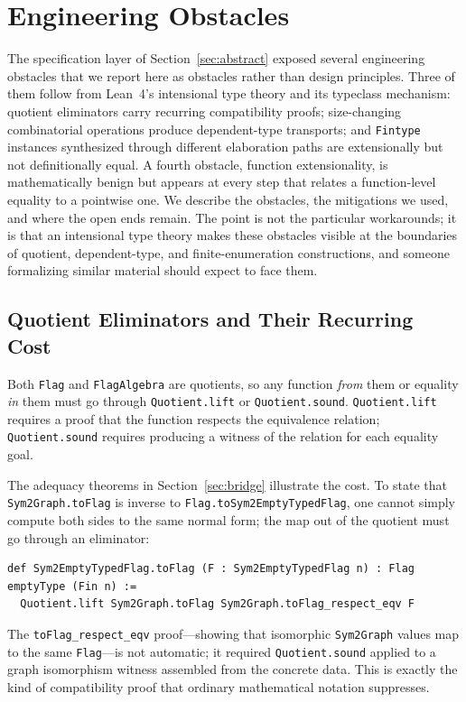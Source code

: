 \documentclass{article}
\newcommand{\lean}[1]{\texttt{#1}}
\begin{document}
\section{Engineering Obstacles}
\label{sec:obstacles}

The specification layer of Section~\ref{sec:abstract} exposed several
engineering obstacles that we report here as obstacles rather than design
principles.  Three of them follow from Lean~4's intensional type theory and
its typeclass mechanism: quotient eliminators carry recurring compatibility
proofs; size-changing combinatorial operations produce dependent-type
transports; and \lean{Fintype} instances synthesized through different
elaboration paths are extensionally but not definitionally equal.  A fourth
obstacle, function extensionality, is mathematically benign but appears at
every step that relates a function-level equality to a pointwise one.  We
describe the obstacles, the mitigations we used, and where the open ends
remain.  The point is not the particular workarounds; it is that an
intensional type theory makes these obstacles visible at the boundaries of
quotient, dependent-type, and finite-enumeration constructions, and someone
formalizing similar material should expect to face them.

\subsection{Quotient Eliminators and Their Recurring Cost}

Both \lean{Flag} and \lean{FlagAlgebra} are quotients, so any function
\emph{from} them or equality \emph{in} them must go through
\lean{Quotient.lift} or \lean{Quotient.sound}.  \lean{Quotient.lift} requires
a proof that the function respects the equivalence relation;
\lean{Quotient.sound} requires producing a witness of the relation for each
equality goal.

The adequacy theorems in Section~\ref{sec:bridge} illustrate the cost.
To state that \lean{Sym2Graph.toFlag} is inverse to
\lean{Flag.toSym2EmptyTypedFlag}, one cannot simply compute both sides to the
same normal form; the map out of the quotient must go through an eliminator:
\begin{lstlisting}
def Sym2EmptyTypedFlag.toFlag (F : Sym2EmptyTypedFlag n) : Flag emptyType (Fin n) :=
  Quotient.lift Sym2Graph.toFlag Sym2Graph.toFlag_respect_eqv F
\end{lstlisting}
The \lean{toFlag\_respect\_eqv} proof---showing that isomorphic
\lean{Sym2Graph} values map to the same \lean{Flag}---is not automatic; it
required \lean{Quotient.sound} applied to a graph isomorphism witness
assembled from the concrete data.  This is exactly the kind of compatibility
proof that ordinary mathematical notation suppresses.
\end{document}
